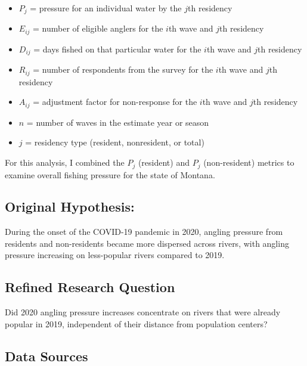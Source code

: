 \documentclass[11pt]{article}
\providecommand{\tightlist}{%
      \setlength{\itemsep}{0pt}\setlength{\parskip}{0pt}}
\begin{document}
\begin{itemize}
\tightlist
\item
  \(P_j\) = pressure for an individual water by the \(j\)th residency
\item
  \(E_{ij}\) = number of eligible anglers for the \(i\)th wave and
  \(j\)th residency
\item
  \(D_{ij}\) = days fished on that particular water for the \(i\)th wave
  and \(j\)th residency
\item
  \(R_{ij}\) = number of respondents from the survey for the \(i\)th
  wave and \(j\)th residency
\item
  \(A_{ij}\) = adjustment factor for non-response for the \(i\)th wave
  and \(j\)th residency
\item
  \(n\) = number of waves in the estimate year or season
\item
  \(j\) = residency type (resident, nonresident, or total)
\end{itemize}

For this analysis, I combined the \(P_j\) (resident) and \(P_j\)
(non-resident) metrics to examine overall fishing pressure for the state
of Montana.

    \hypertarget{original-hypothesis}{%
\subsection{Original Hypothesis:}\label{original-hypothesis}}

During the onset of the COVID-19 pandemic in 2020, angling pressure from
residents and non-residents became more dispersed across rivers, with
angling pressure increasing on less-popular rivers compared to 2019.

    \hypertarget{refined-research-question}{%
\subsection{Refined Research Question}\label{refined-research-question}}

Did 2020 angling pressure increases concentrate on rivers that were
already popular in 2019, independent of their distance from population
centers?

    \hypertarget{data-sources}{%
\subsection{Data Sources}\label{data-sources}}
\end{document}

